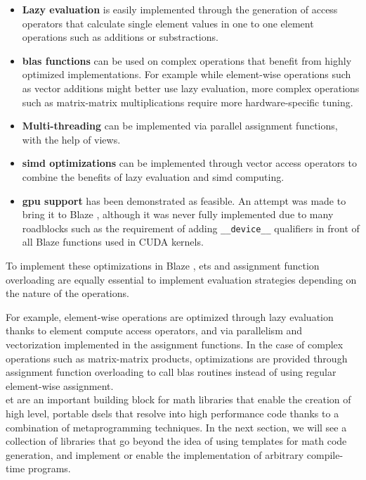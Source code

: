 \documentclass[../main]{subfiles}
\begin{document}
\begin{itemize}

\item
\textbf{Lazy evaluation} is easily implemented through the generation
of access operators that calculate single element values in one to one
element operations such as additions or substractions.

\item
\textbf{\gls{blas} functions} can be used on complex operations that
benefit from highly optimized implementations. For example while
element-wise operations such as vector additions might better use
lazy evaluation, more complex operations such as matrix-matrix multiplications
require more hardware-specific tuning.

\item
\textbf{Multi-threading} can be implemented via parallel assignment functions,
with the help of views.

\item
\textbf{\gls{simd} optimizations} can be implemented through vector access
operators to combine the benefits of lazy evaluation and \gls{simd} computing.

\item
\textbf{\gls{gpu} support} has been demonstrated as feasible.
An attempt was made to bring it to Blaze \cite{blaze_cuda},
although it was never fully implemented due to many roadblocks such as
the requirement of adding \lstinline{__device__} qualifiers in front of
all Blaze functions used in CUDA kernels.

\end{itemize}

To implement these optimizations in Blaze \cite{blazelib},
\glspl{et} and assignment function overloading are equally essential
to implement evaluation strategies depending on the nature of the operations.

For example, element-wise operations are optimized through lazy evaluation
thanks to element compute access operators, and via parallelism
and vectorization implemented in the assignment functions.
In the case of complex operations such as matrix-matrix products,
optimizations are provided through assignment function overloading
to call \gls{blas} routines instead of using regular element-wise assignment.
\\

\acrlong{et} are an important building block for \cpp math libraries that
enable the creation of high level, portable \glspl{dsel} that resolve into
high performance code thanks to a combination of metaprogramming techniques.
In the next section, we will see a collection of libraries that go beyond the
idea of using templates for math code generation, and implement or enable the
implementation of arbitrary compile-time programs.
\end{document}
